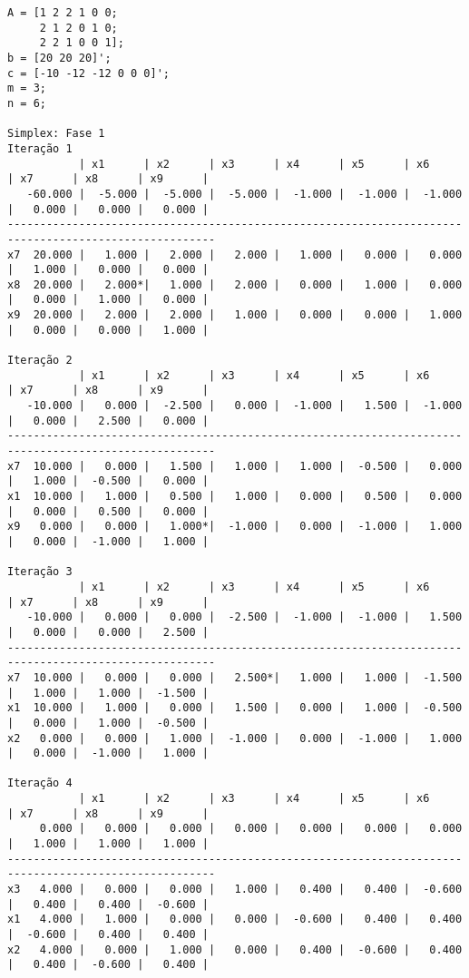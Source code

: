 \documentclass[brazil,times]{abnt}
\begin{document}
{\scriptsize \begin{verbatim}
A = [1 2 2 1 0 0;
	 2 1 2 0 1 0;
	 2 2 1 0 0 1];
b = [20 20 20]';
c = [-10 -12 -12 0 0 0]';
m = 3;
n = 6;

Simplex: Fase 1
Iteração 1
           | x1      | x2      | x3      | x4      | x5      | x6      | x7      | x8      | x9      |
   -60.000 |  -5.000 |  -5.000 |  -5.000 |  -1.000 |  -1.000 |  -1.000 |   0.000 |   0.000 |   0.000 |
------------------------------------------------------------------------------------------------------
x7  20.000 |   1.000 |   2.000 |   2.000 |   1.000 |   0.000 |   0.000 |   1.000 |   0.000 |   0.000 |
x8  20.000 |   2.000*|   1.000 |   2.000 |   0.000 |   1.000 |   0.000 |   0.000 |   1.000 |   0.000 |
x9  20.000 |   2.000 |   2.000 |   1.000 |   0.000 |   0.000 |   1.000 |   0.000 |   0.000 |   1.000 |

Iteração 2
           | x1      | x2      | x3      | x4      | x5      | x6      | x7      | x8      | x9      |
   -10.000 |   0.000 |  -2.500 |   0.000 |  -1.000 |   1.500 |  -1.000 |   0.000 |   2.500 |   0.000 |
------------------------------------------------------------------------------------------------------
x7  10.000 |   0.000 |   1.500 |   1.000 |   1.000 |  -0.500 |   0.000 |   1.000 |  -0.500 |   0.000 |
x1  10.000 |   1.000 |   0.500 |   1.000 |   0.000 |   0.500 |   0.000 |   0.000 |   0.500 |   0.000 |
x9   0.000 |   0.000 |   1.000*|  -1.000 |   0.000 |  -1.000 |   1.000 |   0.000 |  -1.000 |   1.000 |

Iteração 3
           | x1      | x2      | x3      | x4      | x5      | x6      | x7      | x8      | x9      |
   -10.000 |   0.000 |   0.000 |  -2.500 |  -1.000 |  -1.000 |   1.500 |   0.000 |   0.000 |   2.500 |
------------------------------------------------------------------------------------------------------
x7  10.000 |   0.000 |   0.000 |   2.500*|   1.000 |   1.000 |  -1.500 |   1.000 |   1.000 |  -1.500 |
x1  10.000 |   1.000 |   0.000 |   1.500 |   0.000 |   1.000 |  -0.500 |   0.000 |   1.000 |  -0.500 |
x2   0.000 |   0.000 |   1.000 |  -1.000 |   0.000 |  -1.000 |   1.000 |   0.000 |  -1.000 |   1.000 |

Iteração 4
           | x1      | x2      | x3      | x4      | x5      | x6      | x7      | x8      | x9      |
     0.000 |   0.000 |   0.000 |   0.000 |   0.000 |   0.000 |   0.000 |   1.000 |   1.000 |   1.000 |
------------------------------------------------------------------------------------------------------
x3   4.000 |   0.000 |   0.000 |   1.000 |   0.400 |   0.400 |  -0.600 |   0.400 |   0.400 |  -0.600 |
x1   4.000 |   1.000 |   0.000 |   0.000 |  -0.600 |   0.400 |   0.400 |  -0.600 |   0.400 |   0.400 |
x2   4.000 |   0.000 |   1.000 |   0.000 |   0.400 |  -0.600 |   0.400 |   0.400 |  -0.600 |   0.400 |


\end{verbatim}}
\end{document}
